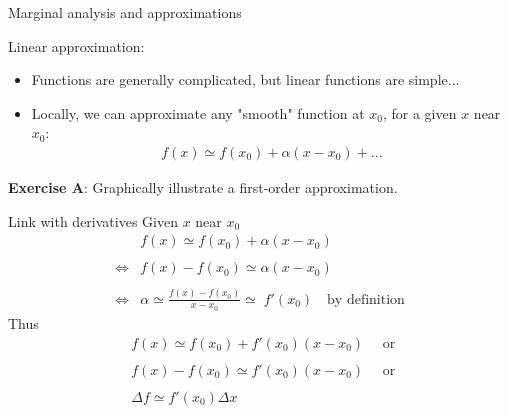 \documentclass[handout]{beamer}
\begin{document}
\begin{frame}{Marginal analysis and approximations}

Linear approximation:

\begin{itemize}\item Functions are generally complicated, but linear functions are simple...
\item Locally, we can approximate any "smooth" function at $x_0$, for  a given $x$ near $x_0$: 
\begin{eqnarray*} 
	f(x) \simeq f(x_0) + \alpha (x-x_0) + ...  
\end{eqnarray*}
\end{itemize}
\textbf{Exercise A}: Graphically illustrate a first-order approximation.
\end{frame}

\begin{frame}{Link with derivatives}
Given $x$ near $x_0$
\begin{align*}
&f(x) \simeq f(x_0) + \alpha (x-x_0) \\ \\ \iff & f(x) -f(x_0) \simeq \alpha (x-x_0)\\\\
 \iff & \alpha \simeq \frac{f(x) -f(x_0)}{x-x_0}  \simeq\; f'(x_0) \quad \text{by definition}
\end{align*}
\pause
Thus  \begin{align*}&f(x) \simeq f(x_0) + f'(x_0) (x-x_0) \quad \text{ or }\\ \\ &f(x) - f(x_0) \simeq f'(x_0) (x-x_0) \quad \text{ or } \\ \\
&\Delta f \simeq f'(x_0) \Delta x
\end{align*}

\end{frame}
\end{document}
